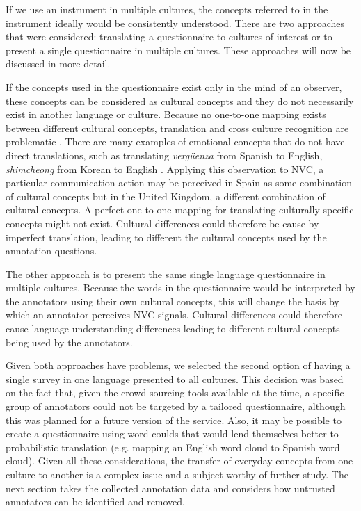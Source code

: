 If we use an instrument in multiple cultures, the concepts referred to in the instrument ideally would be consistently understood. There are two approaches that were considered: translating a questionnaire to cultures of interest or to present a single questionnaire in multiple cultures. These approaches will now be discussed in more detail.

If the concepts used in the questionnaire exist only in the mind of an observer, these concepts can be considered as cultural concepts and they do not necessarily exist in another language or culture. Because no one-to-one mapping exists between different cultural concepts, translation and cross culture recognition are problematic \cite{Elfenbein2002}. There are many examples of emotional concepts that do not have direct translations, such as translating \textit{verg\"{u}enza} from Spanish to English, \textit{shimcheong} from Korean to English \cite{Mendoza2008}. Applying this observation to \ac{NVC}, a particular communication action may be perceived in Spain as some combination of cultural concepts but in the United Kingdom, a different combination of cultural concepts. A perfect one-to-one mapping for translating culturally specific concepts might not exist. Cultural differences could therefore be cause by imperfect translation, leading to different the cultural concepts used by the annotation questions.

The other approach is to present the same single language questionnaire in multiple cultures. Because the words in the questionnaire would be interpreted by the annotators using their own cultural concepts, this will change the basis by which an annotator perceives \ac{NVC} signals. Cultural differences could therefore cause language understanding differences leading to different cultural concepts being used by the annotators.

Given both approaches have problems, we selected the second option of having a single survey in one language presented to all cultures. This decision was based on the fact that, given the crowd sourcing tools available at the time, a specific group of annotators could not be targeted by a tailored questionnaire, although this was planned for a future version of the service. Also, it may be possible to create a questionnaire using word coulds that would lend themselves better to probabilistic translation (e.g. mapping an English word cloud to Spanish word cloud). Given all these considerations, the transfer of everyday concepts from one culture to another is a complex issue and a subject worthy of further study. The next section takes the collected annotation data and considers how untrusted annotators can be identified and removed.

